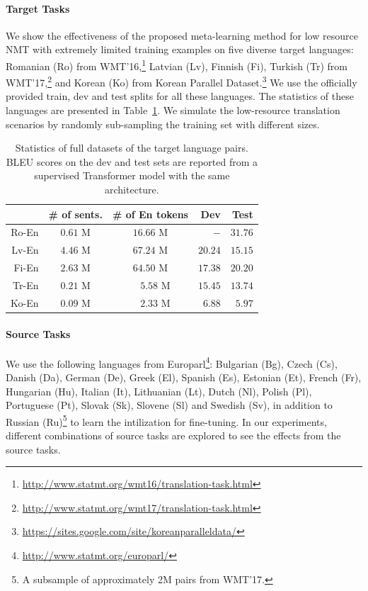 \paragraph{Target Tasks}
We show the effectiveness of the proposed meta-learning method for low resource NMT with extremely limited training examples on five diverse target languages: Romanian (Ro) from WMT'16,\footnote{
\url{http://www.statmt.org/wmt16/translation-task.html}
}
Latvian (Lv), Finnish (Fi), Turkish (Tr) from WMT'17,\footnote{
\url{http://www.statmt.org/wmt17/translation-task.html}
}
and Korean (Ko) from Korean Parallel Dataset.\footnote{
\url{https://sites.google.com/site/koreanparalleldata/}
}
We use the officially provided train, dev and test splits for all these languages. %
The statistics of these languages are presented in Table~\ref{cp6.table.full-dataset}. We simulate the low-resource translation scenarios by randomly sub-sampling the training set with different sizes.

\begin{table}[hptb]
\centering
\begin{tabular}{rcc|rr}
\toprule
& \# of sents. & \# of En tokens & Dev & Test\\
\midrule
Ro-En&$0.61$ M &$16.66$ M&$-$&$31.76$  \\
Lv-En&$4.46$ M &$67.24$ M&$20.24$&$15.15$\\
Fi-En&$2.63$ M &$64.50$ M&$17.38$&$20.20$  \\
Tr-En&$0.21$ M & \ \ $5.58$ M &$15.45$&$13.74$ \\
Ko-En&$0.09$ M & \ \ $2.33$ M &$6.88$&$5.97$ \\
\bottomrule
\end{tabular}
\caption{Statistics of full datasets of the target language pairs. BLEU scores on the dev and test sets are reported from a supervised Transformer model with the same architecture.}
\label{cp6.table.full-dataset}
\end{table}



\paragraph{Source Tasks}

We use the following languages from Europarl\footnote{
\url{http://www.statmt.org/europarl/}
}:
Bulgarian (Bg),
Czech (Cs), 
Danish (Da),
German (De),
Greek  (El),
Spanish (Es),
Estonian  (Et),
French (Fr),
Hungarian   (Hu),
Italian (It),
Lithuanian  (Lt),
Dutch   (Nl),
Polish  (Pl),
Portuguese  (Pt),
Slovak  (Sk),
Slovene (Sl) and
Swedish (Sv), in addition to Russian (Ru)\footnote{
A subsample of approximately 2M pairs from WMT'17.
} to learn the intilization for fine-tuning. In our experiments, different combinations of source tasks are explored to see the effects from the source tasks.

